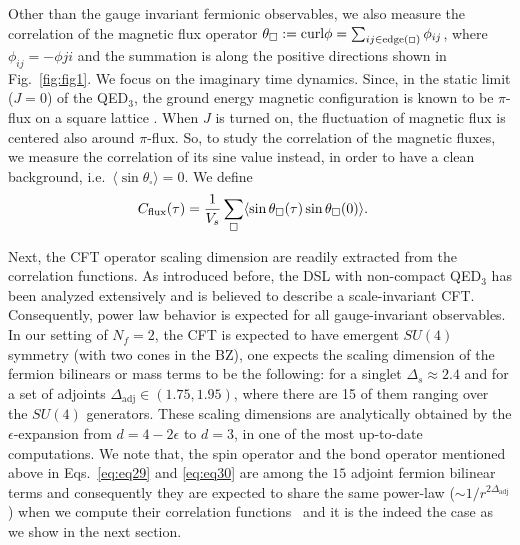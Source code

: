 \documentclass[aps,prl,twocolumn,superscriptaddress,showpacs,longbibliography]{revtex4-2}
\renewcommand{\vec}[1]{\mathbf{#1}}
\newcommand{\tx}[1]{\textmd{#1}}
\newcommand{\onefrac}[1]{\frac{1}{#1}}
\newcommand{\reffg}[1]{\textmd{Fig.\ }\ref{#1}}
\begin{document}

Other than the gauge invariant fermionic observables, we also measure the correlation of the magnetic flux operator $\theta_\square := \tx{curl}\phi = \sum_{ij\in\tx{edge}(\Box)}\phi_{ij}$, where $\phi_{ij} = -\phi{ji}$ and the summation is along the positive directions shown in \reffg{fig:fig1}. We focus on the imaginary time dynamics. Since, in the static limit ($J=0$) of the QED$_3$, the ground energy magnetic configuration is known to be $\pi$-flux on a square lattice \cite{lieb1994flux}. When $J$ is turned on, the fluctuation of magnetic flux is centered also around $\pi$-flux. So, to study the correlation of the magnetic fluxes, we measure the correlation of its sine value instead, in order to have a clean background, i.e.~$\langle \sin\theta_\square\rangle = 0$. We define
\begin{align}
    C_\tx{flux}(\tau) &= \onefrac{V_s}
    \sum_\square \langle \sin \theta_\square(\tau)\sin \theta_\square(0) \rangle. \label{eq:eq33}
\end{align}

Next, the CFT operator scaling dimension are readily extracted from the correlation functions. As introduced before, the DSL with non-compact QED$_3$ has been analyzed extensively and is believed to describe a scale-invariant CFT.  Consequently, power law behavior is expected for all gauge-invariant observables. In our setting of $N_f=2$, the CFT is expected to have emergent $SU(4)$ symmetry (with two cones in the BZ), one expects the scaling dimension of the fermion bilinears or mass terms to be the following: for a singlet $\Delta_s \approx 2.4$ and for a set of adjoints $\Delta_{\text{adj}} \in (1.75,1.95)$, where there are 15 of them ranging over the $SU(4)$ generators. These scaling dimensions are analytically obtained by the $\epsilon$-expansion from $d=4-2\epsilon$ to $d=3$, in one of the most up-to-date computations\cite{di2017scaling}. We note that, the spin operator and the bond operator mentioned above in Eqs.~\eqref{eq:eq29} and \eqref{eq:eq30} are among the $15$ adjoint fermion bilinear terms and consequently they are expected to share the same power-law ($\sim 1/r^{2\Delta_{\text{adj}}}$) when we compute their correlation functions~\cite{Hermele2005,XYXuU12018} and it is the indeed the case as we show in the next section.
\end{document}
